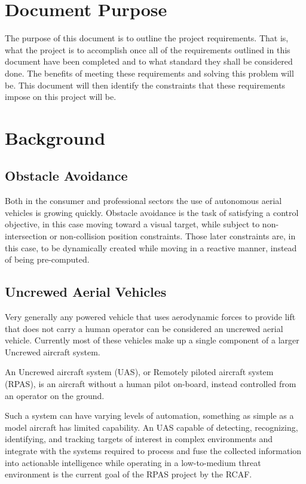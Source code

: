 \documentclass[]{report}
\begin{document}
\section{Document Purpose}

The purpose of this document is to outline the project requirements. That is, what the project is to accomplish once all of the requirements outlined in this document have been completed and to what standard they shall be considered done. The benefits of meeting these requirements and solving this problem will be. This document will then identify the constraints that these requirements impose on this project will be.

\section{Background}

\subsection{Obstacle Avoidance}

Both in the consumer and professional sectors the use of autonomous aerial vehicles is growing quickly. 
Obstacle avoidance is the task of satisfying a control objective, in this case moving toward a visual target, while subject to non-intersection or non-collision position constraints. Those later constraints are, in this case, to be dynamically created while moving in a reactive manner, instead of being pre-computed.

\subsection{Uncrewed Aerial Vehicles}

Very generally any powered vehicle that uses aerodynamic forces to provide lift that does not carry a human operator can be considered an uncrewed aerial vehicle. Currently most of these vehicles make up a single component of a larger Uncrewed aircraft system. 

An Uncrewed aircraft system (UAS), or Remotely piloted aircraft system (RPAS), is an aircraft without a human pilot on-board, instead controlled from an operator on the ground. 

Such a system can have varying levels of automation, something as simple as a model aircraft has limited capability. An UAS capable of detecting, recognizing, identifying, and tracking targets of interest in complex environments and integrate with the systems required to process and fuse the collected information into actionable intelligence while operating in a low-to-medium threat environment is the current goal of the RPAS project by the RCAF. 
\end{document}
